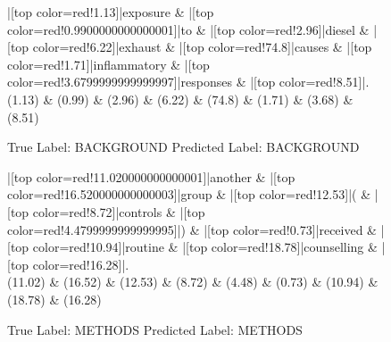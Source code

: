 \documentclass[a4paper, landscape]{article}
\begin{document}
\begin{figure}
\begin{center}
\begin{dependency}
\begin{deptext}
|[top color=red!1.13]|exposure \& |[top color=red!0.9900000000000001]|to \& |[top color=red!2.96]|diesel \& |[top color=red!6.22]|exhaust \& |[top color=red!74.8]|causes \& |[top color=red!1.71]|inflammatory \& |[top color=red!3.6799999999999997]|responses \& |[top color=red!8.51]|.\\
(1.13) \& (0.99) \& (2.96) \& (6.22) \& (74.8) \& (1.71) \& (3.68) \& (8.51)\\
\end{deptext}
\end{dependency}
\end{center}
\caption{True Label: BACKGROUND Predicted Label: BACKGROUND}
\end{figure}
\clearpage
\begin{figure}
\begin{center}
\begin{dependency}
\begin{deptext}
|[top color=red!11.020000000000001]|another \& |[top color=red!16.520000000000003]|group \& |[top color=red!12.53]|( \& |[top color=red!8.72]|controls \& |[top color=red!4.4799999999999995]|) \& |[top color=red!0.73]|received \& |[top color=red!10.94]|routine \& |[top color=red!18.78]|counselling \& |[top color=red!16.28]|.\\
(11.02) \& (16.52) \& (12.53) \& (8.72) \& (4.48) \& (0.73) \& (10.94) \& (18.78) \& (16.28)\\
\end{deptext}
\end{dependency}
\end{center}
\caption{True Label: METHODS Predicted Label: METHODS}
\end{figure}
\clearpage
\end{document}
